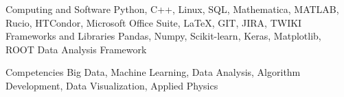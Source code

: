 
\begin{cvskills}
  \cvskill
    {Computing and Software} %
    {Python, C++, Linux, SQL, Mathematica, MATLAB, Rucio, HTCondor, Microsoft Office Suite, \LaTeX, GIT, JIRA, TWIKI} %
     \cvskill
    {Frameworks and Libraries} %
    {Pandas, Numpy, Scikit-learn, Keras, Matplotlib, ROOT Data Analysis Framework} %


  \cvskill
    {Competencies} %
    {Big Data, Machine Learning, Data Analysis, Algorithm Development, Data Visualization, Applied Physics} %

\end{cvskills}
